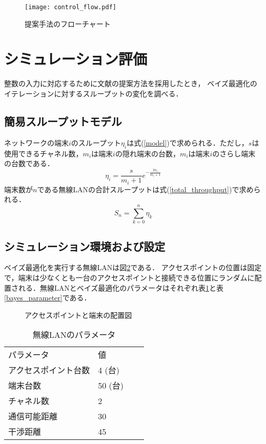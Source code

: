 \documentclass[a4paper,11pt]{jarticle}
\begin{document}
\begin{figure}[t]
  \centering
  \texttt{[image: control\_flow.pdf]}
  \caption{提案手法のフローチャート}
  \label{control_flow}
\end{figure}

\section{シミュレーション評価}
整数の入力に対応するために文献\cite{Garrido-Merchan2018}の提案方法を採用したとき，
ベイズ最適化のイテレーションに対するスループットの変化を調べる．

\subsection{簡易スループットモデル\cite{Wu2000}}
ネットワークの端末$i$のスループット$\eta_i$は式(\ref{model})で求められる．ただし，$s$は使用できるチャネル数，$m_i$は端末$i$の隠れ端末の台数，$m_i$は端末$i$のさらし端末の台数である．
\begin{equation}
  \eta_i=\frac{s}{m_i+1}e^{-\frac{2n_i}{m_i+1}} \label{model}
\end{equation}
端末数が$n$である無線LANの合計スループットは式(\ref{total_throughput})で求められる．
\begin{equation}
  S_n=\sum_{k=0}^{n}\eta_k \label{total_throughput}
\end{equation}

\subsection{シミュレーション環境および設定}
ベイズ最適化を実行する無線LANは図\ref{position}である．
アクセスポイントの位置は固定で，端末は少なくとも一台のアクセスポイントと接続できる位置にランダムに配置される．無線LANとベイズ最適化のパラメータはそれぞれ表\ref{network_parameter}と表\ref{bayes_parameter}である．

\begin{figure}[t]
  \centering
  
  \caption{アクセスポイントと端末の配置図}
  \label{position}
\end{figure}

\begin{table}[H]
\centering
\caption{無線LANのパラメータ}
\begin{tabular}{l|lll}
パラメータ & 値 &  &  \\ \cline{1-2}
アクセスポイント台数 & 4 (台)  &  &  \\
端末台数 & 50 (台) &  &  \\
チャネル数 & 2 &  &  \\
通信可能距離  & 30 &  &  \\
干渉距離 & 45 &  &  \\
\end{tabular}
\label{network_parameter}
\end{table}
\end{document}
